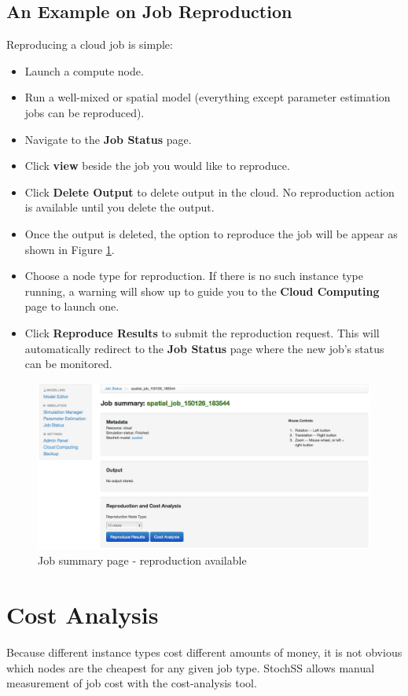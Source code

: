 \subsection{An Example on Job Reproduction}
Reproducing a cloud job is simple:

\begin{itemize}
\item Launch a compute node.
\item Run a well-mixed or spatial model (everything except parameter estimation jobs can be reproduced).
\item Navigate to the \textbf{Job Status} page.
\item Click \textbf{view} beside the job you would like to reproduce.
\item Click \textbf{Delete Output} to delete output in the cloud. No reproduction action is available until you delete the output.
\item Once the output is deleted, the option to reproduce the job will be appear as shown in Figure \ref{fig:3}.
\item Choose a node type for reproduction. If there is no such instance type running, a warning will show up to guide you to the \textbf{Cloud Computing} page to launch one.
\item Click \textbf{Reproduce Results} to submit the reproduction request. This will automatically redirect to the \textbf{Job Status} page where the new job's status can be monitored.
\end{itemize}

\begin{figure}[!ht]
\centering
\includegraphics[scale=0.35]{T6/T6_fig_reproduction1.png}
\caption{Job summary page - reproduction available}
\label{fig:3}
\end{figure}

\section{Cost Analysis}
Because different instance types cost different amounts of money, it is not obvious which nodes are the cheapest for any given job type. StochSS allows manual measurement of job cost with the cost-analysis tool.

